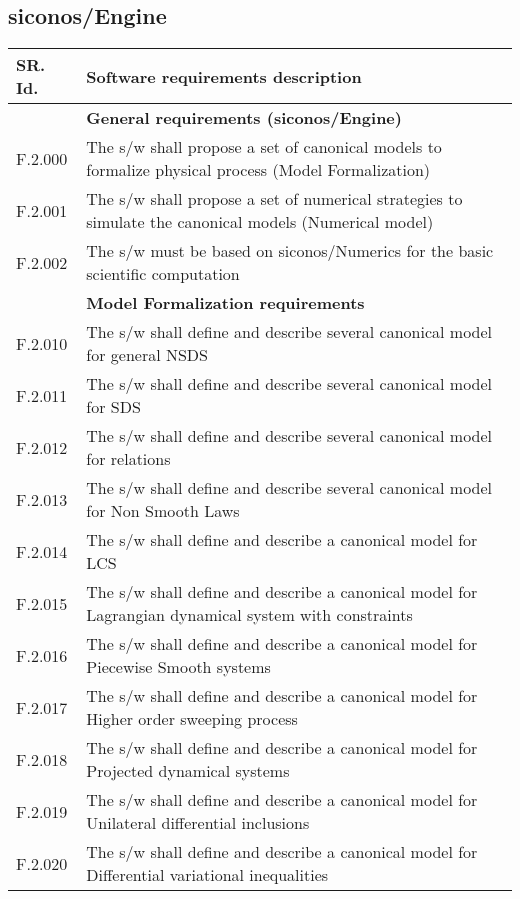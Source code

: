 \subsection{\ac{siconos}/Engine}
\begin{longtable}{%
    |>{\columncolor[gray]{.8}}p{}%
    |>{\columncolor[gray]{.95}}p{}|}
  \hline
  \rowcolor[gray]{.8}   SR. Id. & Software requirements description \\
  \hline 
  \hline
  & \textbf{ General requirements (\ac{siconos}/Engine)}\\
  \hline
  F.2.000 & The s/w shall propose a set of  canonical models to formalize physical process  (Model Formalization) \\
  F.2.001 & The s/w shall propose a set of numerical strategies to simulate the  canonical models (Numerical model)\\
  F.2.002 & The s/w  must be based on \ac{siconos}/Numerics  for the basic  scientific computation \\
  \hline
  & \textbf{Model Formalization requirements }\\
  \hline
  F.2.010  &  The s/w shall  define and describe several canonical model for general NSDS \\
  F.2.011  &  The s/w shall  define and describe several canonical model for SDS\\
  F.2.012  &  The s/w shall  define and describe several canonical model for relations\\
  F.2.013  &  The s/w shall  define and describe several canonical model for Non Smooth Laws\\  
  F.2.014  &  The s/w shall  define and describe a canonical model for LCS  \\
  F.2.015  &  The s/w shall  define and describe a canonical model for Lagrangian dynamical system with constraints \\
  F.2.016  &  The s/w shall  define and describe a canonical model for Piecewise Smooth systems \\ 
  F.2.017  &  The s/w shall  define and describe a canonical model for Higher order sweeping process\\ 
  F.2.018  &  The s/w shall  define and describe a canonical model for Projected dynamical systems \\ 
  F.2.019  &  The s/w shall  define and describe a canonical model for Unilateral differential inclusions \\
  F.2.020  &  The s/w shall  define and describe a canonical model for Differential variational inequalities  \\

\end{longtable}
